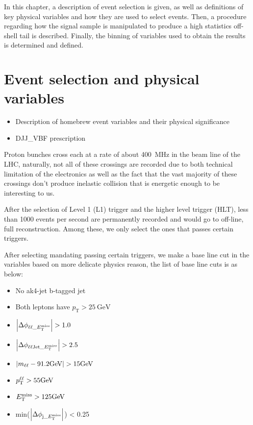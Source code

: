 In this chapter, a description of event selection is given, as well as definitions of
key physical variables and how they are used to select events. Then, a procedure regarding
how the signal sample is manipulated to produce a high statistics off-shell tail is described.
Finally, the binning of variables used to obtain the results is determined and defined.

\section{Event selection and physical variables}
\begin{itemize}
    \item Description of homebrew event variables and their physical significance
    \item DJJ\_VBF prescription
\end{itemize}
Proton bunches cross each at a rate of about \SI{400}{\mega\hertz} in the beam line of
the LHC, naturally, not all of these crossings are recorded due to both technical
limitation of the electronics as well as the fact that the vast majority of these
crossings don't produce inelastic collision that is energetic enough to be interesting to us.

After the selection of Level 1 (L1) trigger and the higher level trigger (HLT), less than 1000
events per second are permanently recorded and would go to off-line, full reconstruction. Among these,
we only select the ones that passes certain triggers.

After selecting mandating passing certain triggers, we make a base line cut in the variables
based on more delicate physics reason, the list of base line cuts is as below:
\begin{itemize}
    \item No ak4-jet b-tagged jet
    \item Both leptons have $p_\mathrm{T} > \SI{25}{\giga\electronvolt}$
    \item $\abs{\Delta\phi_{\ell\ell\_E_{\mathrm{T}}^{\mathrm{miss}}}} > 1.0$
    \item $\abs{\Delta\phi_{\ell\ell\mathrm{Jet}\_E_{\mathrm{T}}^{\mathrm{miss}}}} > 2.5$
    \item $\abs{m_{\ell\ell} - 91.2\si{\giga\electronvolt}} > 15\si{\giga\electronvolt}$
    \item $p_\mathrm{T}^{\ell\ell} > 55\si{\giga\electronvolt}$
    \item $E_{\mathrm{T}}^{\mathrm{miss}} > 125\si{\giga\electronvolt}$
    \item min($\abs{ \Delta\phi_{\mathrm{j}\_E_{\mathrm{T}}^{\mathrm{miss}}}}$) < 0.25
\end{itemize}
\newpage\phantom{blabla}

